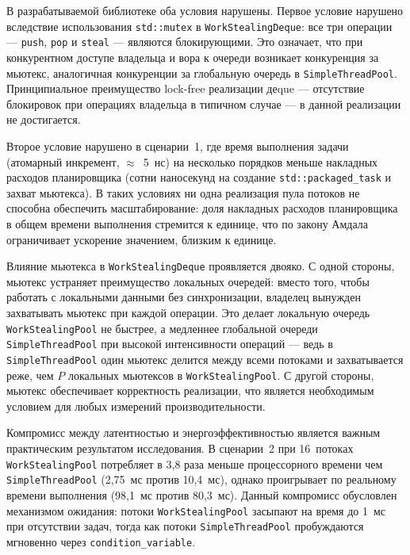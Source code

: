 В разрабатываемой библиотеке оба условия нарушены. Первое
условие нарушено вследствие использования \texttt{std::mutex}
в \texttt{WorkStealingDeque}: все три операции --- \texttt{push},
\texttt{pop} и \texttt{steal} --- являются блокирующими.
Это означает, что при конкурентном доступе владельца и вора
к очереди возникает конкуренция за мьютекс, аналогичная
конкуренции за глобальную очередь в \texttt{SimpleThreadPool}.
Принципиальное преимущество lock-free реализации деque ---
отсутствие блокировок при операциях владельца в типичном
случае --- в данной реализации не достигается.

Второе условие нарушено в сценарии~1, где время выполнения
задачи (атомарный инкремент, $\approx$~5~нс) на несколько
порядков меньше накладных расходов планировщика (сотни
наносекунд на создание \texttt{std::packaged\_task} и захват
мьютекса). В таких условиях ни одна реализация пула потоков
не способна обеспечить масштабирование: доля накладных расходов
планировщика в общем времени выполнения стремится к единице,
что по закону Амдала~\cite{Amdahl1967} ограничивает ускорение
значением, близким к единице.

Влияние мьютекса в \texttt{WorkStealingDeque} проявляется
двояко. С одной стороны, мьютекс устраняет преимущество
локальных очередей: вместо того, чтобы работать с локальными
данными без синхронизации, владелец вынужден захватывать
мьютекс при каждой операции. Это делает локальную очередь
\texttt{WorkStealingPool} не быстрее, а медленнее глобальной
очереди \texttt{SimpleThreadPool} при высокой интенсивности
операций --- ведь в \texttt{SimpleThreadPool} один мьютекс
делится между всеми потоками и захватывается реже, чем $P$
локальных мьютексов в \texttt{WorkStealingPool}. С другой
стороны, мьютекс обеспечивает корректность реализации, что
является необходимым условием для любых измерений
производительности.

Компромисс между латентностью и энергоэффективностью является
важным практическим результатом исследования. В сценарии~2
при 16~потоках \texttt{WorkStealingPool} потребляет в 3,8 раза
меньше процессорного времени чем \texttt{SimpleThreadPool}
(2,75~мс против 10,4~мс), однако проигрывает по реальному
времени выполнения (98,1~мс против 80,3~мс). Данный компромисс
обусловлен механизмом ожидания: потоки \texttt{WorkStealingPool}
засыпают на время до 1~мс при отсутствии задач, тогда как
потоки \texttt{SimpleThreadPool} пробуждаются мгновенно через
\texttt{condition\_variable}.

